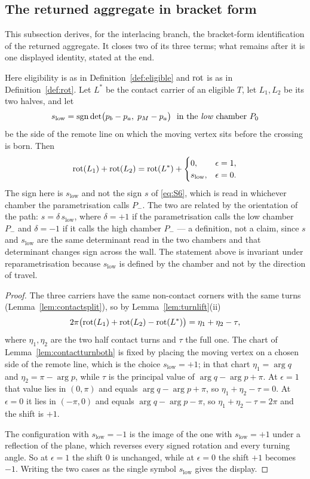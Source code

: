 \subsection{The returned aggregate in bracket form}\label{sec:bracket}

This subsection derives, for the interlacing branch, the bracket-form
identification of the returned aggregate. It closes two of its three terms;
what remains after it is one displayed identity, stated at the end.

\begin{lemma}\label{lem:rotshift}
Here eligibility is as in Definition~\ref{def:eligible} and $\operatorname{rot}$ is as in
Definition~\ref{def:rot}.
Let $L^{*}$ be the contact carrier of an eligible $T$, let $L_1,L_2$ be its two
halves, and let
\[
   s_{\mathrm{low}}=\sgn\det\bigl(p_b-p_a,\;p_M-p_a\bigr)\ \text{ in the
   \emph{low} chamber }P_0
\]
be the side of the remote line on which the moving vertex sits before the
crossing is born. Then
\[
   \operatorname{rot}(L_1)+\operatorname{rot}(L_2)=\operatorname{rot}(L^{*})+\begin{cases}0,&\epsilon=1,\\
   s_{\mathrm{low}},&\epsilon=0.\end{cases}
\]
The sign here is $s_{\mathrm{low}}$ and not the sign $s$ of \eqref{eq:S6},
which is read in whichever chamber the parametrisation calls $P_-$. The two are
related by the orientation of the path: $s=\delta\,s_{\mathrm{low}}$, where
$\delta=+1$ if the parametrisation calls the low chamber $P_-$ and $\delta=-1$
if it calls the high chamber $P_-$ --- a definition, not a claim, since $s$ and
$s_{\mathrm{low}}$ are the same determinant read in the two chambers and that
determinant changes sign across the wall. The statement above is invariant
under
reparametrisation because $s_{\mathrm{low}}$ is defined by the chamber and not
by the direction of travel.
\end{lemma}
\begin{proof}
The three carriers have the same non-contact corners with the same turns
(Lemma~\ref{lem:contactsplit}), so by Lemma~\ref{lem:turnlift}(ii)
\[
   2\pi\bigl(\operatorname{rot}(L_1)+\operatorname{rot}(L_2)-\operatorname{rot}(L^{*})\bigr)=\eta_1+\eta_2-\tau,
\]
where $\eta_1,\eta_2$ are the two half contact turns and $\tau$ the full one.
The chart of Lemma~\ref{lem:contactturnboth} is fixed by placing the moving
vertex on a chosen side of the remote line, which is the choice
$s_{\mathrm{low}}=+1$; in that chart $\eta_1=\arg q$ and $\eta_2=\pi-\arg p$, while $\tau$ is the principal
value of $\arg q-\arg p+\pi$. At $\epsilon=1$ that value lies in $(0,\pi)$ and
equals $\arg q-\arg p+\pi$, so $\eta_1+\eta_2-\tau=0$. At $\epsilon=0$ it lies
in $(-\pi,0)$ and equals $\arg q-\arg p-\pi$, so $\eta_1+\eta_2-\tau=2\pi$ and
the shift is $+1$.

The configuration with $s_{\mathrm{low}}=-1$ is the image of the one with
$s_{\mathrm{low}}=+1$ under a reflection of the plane, which reverses every signed rotation and every turning
angle. So at $\epsilon=1$ the shift $0$ is unchanged, while at $\epsilon=0$ the
shift $+1$ becomes $-1$. Writing the two cases as the single symbol
$s_{\mathrm{low}}$ gives the display.
\end{proof}

